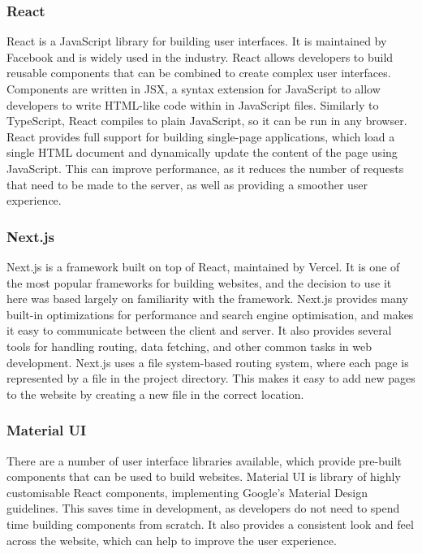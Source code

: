 \documentclass[../main.tex]{subfiles}
\begin{document}
            \subsubsection{React}
                React is a JavaScript library for building user interfaces.
                It is maintained by Facebook and is widely used in the industry.
                React allows developers to build reusable components that can be combined to
                    create complex user interfaces.
                Components are written in JSX, a syntax extension for JavaScript to allow
                    developers to write HTML-like code within in JavaScript files.
                Similarly to TypeScript, React compiles to plain JavaScript, so it can be run
                    in any browser.
                React provides full support for building single-page applications, which load a
                    single HTML document and dynamically update the content of the page using
                    JavaScript.
                This can improve performance, as it reduces the number of requests that need to
                    be made to the server, as well as providing a smoother user experience.

            \subsubsection{Next.js}
                Next.js is a framework built on top of React, maintained by Vercel.
                It is one of the most popular frameworks for building websites, and the
                    decision to use it here was based largely on familiarity with the framework.
                Next.js provides many built-in optimizations for performance and search engine
                    optimisation, and makes it easy to communicate between the client and server.
                It also provides several tools for handling routing, data fetching, and other
                    common tasks in web development.
                Next.js uses a file system-based routing system, where each page is represented
                    by a file in the project directory.
                This makes it easy to add new pages to the website by creating a new file in
                    the correct location.

            \subsubsection{Material UI}
                There are a number of user interface libraries available, which provide
                    pre-built components that can be used to build websites.
                Material UI is library of highly customisable React components, implementing
                    Google's Material Design guidelines.
                This saves time in development, as developers do not need to spend time
                    building components from scratch.
                It also provides a consistent look and feel across the website, which can help
                    to improve the user experience.
\end{document}
